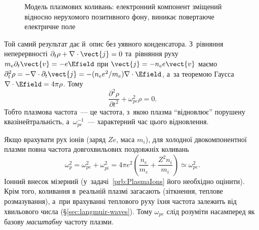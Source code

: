 \begin{figure}[h!]\centering
	\begin{subfigure}[t]{0.5\linewidth}\centering
	\end{subfigure}%
	\begin{subfigure}[t]{0.5\linewidth}\centering
	\end{subfigure}
	\caption{Модель плазмових коливань: електронний компонент зміщений відносно нерухомого
		позитивного фону, виникає повертаюче електричне поле}
	\label{pic:plasma-oscillations}
\end{figure}

Той самий результат дає й~опис без уявного конденсатора. З~рівняння неперервності
$\partial_t\rho+\nabla\cdot\vect{j}=0$ та~рівняння руху $m_e\partial_t\vect{v}=-e\Efield$
при $\vect{j}=-n_ee\vect{v}$ маємо
$\partial_t^2\rho=-\nabla\cdot\partial_t\vect{j}=-(n_ee^2/m_e)\nabla\cdot\Efield$, а~за
теоремою Гаусса $\nabla\cdot\Efield=4\pi\rho$. Тому
\begin{equation*}
	\frac{\partial^2\rho}{\partial t^2}+\omega_{pe}^2\rho=0.
\end{equation*}
Тобто плазмова частота~--- це частота, з~якою плазма \enquote{відновлює} порушену
квазінейтральність, а~$\omega_{pe}^{-1}$~--- характерний час цього відновлення.

Якщо врахувати рух іонів (заряд $Ze$, маса $m_i$), для холодної двокомпонентної плазми
повна частота довгохвильових поздовжніх коливань
\begin{equation*}
	\omega_p^2=\omega_{pe}^2+\omega_{pi}^2=4\pi e^2\left(\frac{n_e}{m_e}+\frac{Z^2n_i}{m_i}\right)\simeq\omega_{pe}^2.
\end{equation*}
Іонний внесок мізерний (у~задачі~\ref{prb:PlasmaIons} його необхідно оцінити). Крім того,
коливання в~реальній плазмі загасають (зіткнення, теплове розмазування), а~при врахуванні
теплового руху їхня частота залежить від хвильового числа (§\ref{sec:langmuir-waves}).
Тому $\omega_{pe}$ слід розуміти насамперед як базову \emph{масштабну} частоту плазми.

